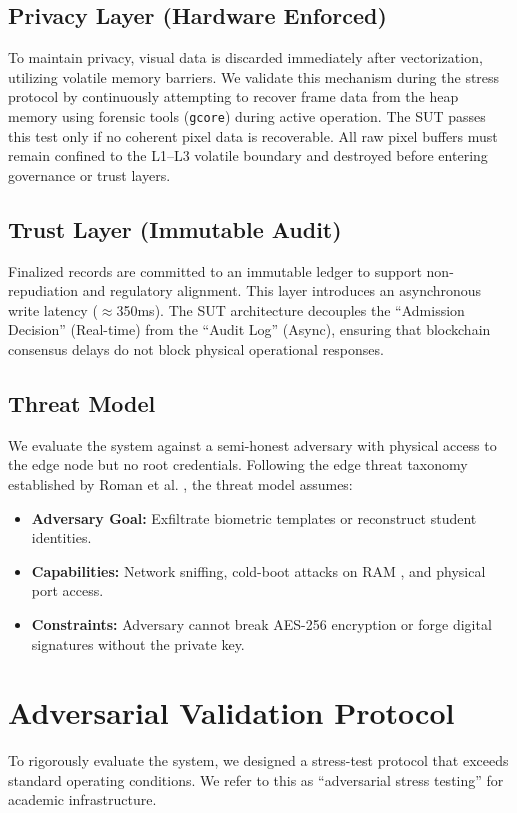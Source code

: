 \documentclass[conference]{IEEEtran}
\begin{document}
\subsection{Privacy Layer (Hardware Enforced)}
To maintain privacy, visual data is discarded immediately after vectorization, utilizing volatile memory barriers. We validate this mechanism during the stress protocol by continuously attempting to recover frame data from the heap memory using forensic tools (\texttt{gcore}) during active operation. The SUT passes this test only if no coherent pixel data is recoverable. All raw pixel buffers must remain confined to the L1--L3 volatile boundary and destroyed before entering governance or trust layers.

\subsection{Trust Layer (Immutable Audit)}
Finalized records are committed to an immutable ledger to support non-repudiation and regulatory alignment. This layer introduces an asynchronous write latency ($\approx$350ms). The SUT architecture decouples the ``Admission Decision'' (Real-time) from the ``Audit Log'' (Async), ensuring that blockchain consensus delays do not block physical operational responses. 

\subsection{Threat Model}
We evaluate the system against a semi-honest adversary with physical access to the edge node but no root credentials. Following the edge threat taxonomy established by Roman et al. \cite{b14}, the threat model assumes:
\begin{itemize}
    \item \textbf{Adversary Goal:} Exfiltrate biometric templates or reconstruct student identities.
    \item \textbf{Capabilities:} Network sniffing, cold-boot attacks on RAM \cite{b11}, and physical port access.
    \item \textbf{Constraints:} Adversary cannot break AES-256 encryption or forge digital signatures without the private key.
\end{itemize}

\section{Adversarial Validation Protocol}
To rigorously evaluate the system, we designed a stress-test protocol that exceeds standard operating conditions. We refer to this as ``adversarial stress testing'' for academic infrastructure.
\end{document}
